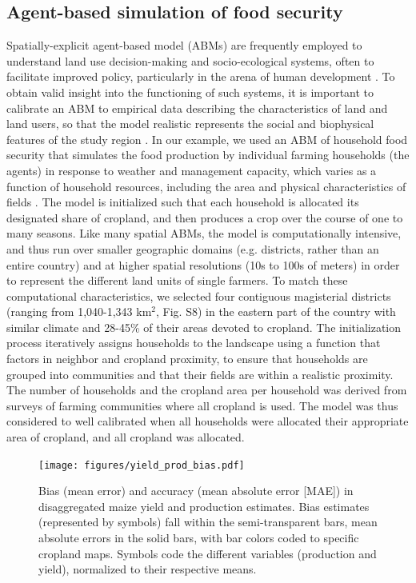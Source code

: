 \documentclass{pnastwo}
\begin{document}
\begin{article}
\subsection{Agent-based simulation of food security}
Spatially-explicit agent-based model (ABMs) are frequently employed to understand land use decision-making and socio-ecological systems, often to facilitate improved policy, particularly in the arena of human development \cite{berger_creating_2006}. To obtain valid insight into the functioning of such systems, it is important to calibrate an ABM to empirical data describing the characteristics of land and land users, so that the model realistic represents the social and biophysical features of the study region \cite{berger_creating_2006}. In our example, we used an ABM of household food security that simulates the food production by individual farming households (the agents) in response to weather and management capacity, which varies as a function of household resources, including the area and physical characteristics of fields \cite{chen_dependency_2013}. The model is initialized such that each household is allocated its designated share of cropland, and then produces a crop over the course of one to many seasons. Like many spatial ABMs, the model is computationally intensive, and thus run over smaller geographic domains (e.g. districts, rather than an entire country) and at higher spatial resolutions (10s to 100s of meters) in order to represent the different land units of single farmers. To match these computational characteristics, we selected four contiguous magisterial districts (ranging from 1,040-1,343 km$^2$, Fig. S8) in the eastern part of the country with similar climate and 28-45\% of their areas devoted to cropland. The initialization process iteratively assigns households to the landscape using a function that factors in neighbor and cropland proximity, to ensure that households are grouped into communities and that their fields are within a realistic proximity. The number of households and the cropland area per household was derived from surveys of farming communities where all cropland is used. The model was thus considered to well calibrated when all households were allocated their appropriate area of cropland, and all cropland was allocated. 

\begin{figure}[!hb]
\centerline{\texttt{[image: figures/yield\_prod\_bias.pdf]}}
\caption{Bias (mean error) and accuracy (mean absolute error [MAE]) in disaggregated maize yield and production estimates. Bias estimates (represented by symbols) fall within the semi-transparent bars, mean absolute errors in the solid bars, with bar colors coded to specific cropland maps.  Symbols code the different variables (production and yield), normalized to their respective means.}
\label{afoto}
\end{figure}


\end{article}
\end{document}
